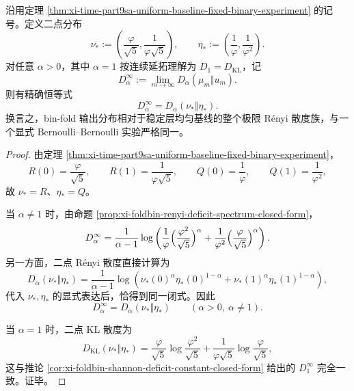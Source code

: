 \begin{theorem}\label{thm:xi-time-part9sa-renyi-spectrum-explicit-bernoulli-experiment}
沿用定理 \ref{thm:xi-time-part9sa-uniform-baseline-fixed-binary-experiment} 的记号。定义二点分布
\[
\nu_*:=
\left(
\frac{\varphi}{\sqrt5},
\frac{1}{\varphi\sqrt5}
\right),
\qquad
\eta_*:=
\left(
\frac{1}{\varphi},
\frac{1}{\varphi^2}
\right).
\]
对任意 \(\alpha>0\)，其中 \(\alpha=1\) 按连续延拓理解为 \(D_1=D_{\mathrm{KL}}\)，记
\[
D_\alpha^\infty:=\lim_{m\to\infty}D_\alpha(\mu_m\Vert u_m).
\]
则有精确恒等式
\[
D_\alpha^\infty=D_\alpha(\nu_*\Vert \eta_*).
\]
换言之，bin-fold 输出分布相对于稳定层均匀基线的整个极限 Rényi 散度族，与一个显式 Bernoulli--Bernoulli 实验严格同一。
\end{theorem}
\begin{proof}
由定理 \ref{thm:xi-time-part9sa-uniform-baseline-fixed-binary-experiment}，
\[
R(0)=\frac{\varphi}{\sqrt5},
\qquad
R(1)=\frac{1}{\varphi\sqrt5},
\qquad
Q(0)=\frac{1}{\varphi},
\qquad
Q(1)=\frac{1}{\varphi^2},
\]
故 \(\nu_*=R\)、\(\eta_*=Q\)。

当 \(\alpha\neq 1\) 时，由命题 \ref{prop:xi-foldbin-renyi-deficit-spectrum-closed-form}，
\[
D_\alpha^\infty
=
\frac{1}{\alpha-1}\log\left(
\frac{1}{\varphi}\Bigl(\frac{\varphi^2}{\sqrt5}\Bigr)^\alpha
+
\frac{1}{\varphi^2}\Bigl(\frac{\varphi}{\sqrt5}\Bigr)^\alpha
\right).
\]
另一方面，二点 Rényi 散度直接计算为
\[
D_\alpha(\nu_*\Vert \eta_*)
=
\frac{1}{\alpha-1}\log\left(
\nu_*(0)^\alpha\eta_*(0)^{1-\alpha}
+
\nu_*(1)^\alpha\eta_*(1)^{1-\alpha}
\right),
\]
代入 \(\nu_*,\eta_*\) 的显式表达后，恰得到同一闭式。因此
\[
D_\alpha^\infty=D_\alpha(\nu_*\Vert \eta_*)
\qquad
(\alpha>0,\ \alpha\neq 1).
\]

当 \(\alpha=1\) 时，二点 KL 散度为
\[
D_{\mathrm{KL}}(\nu_*\Vert \eta_*)
=
\frac{\varphi}{\sqrt5}\log\frac{\varphi^2}{\sqrt5}
+
\frac{1}{\varphi\sqrt5}\log\frac{\varphi}{\sqrt5},
\]
这与推论 \ref{cor:xi-foldbin-shannon-deficit-constant-closed-form} 给出的 \(D_1^\infty\) 完全一致。证毕。
\end{proof}

